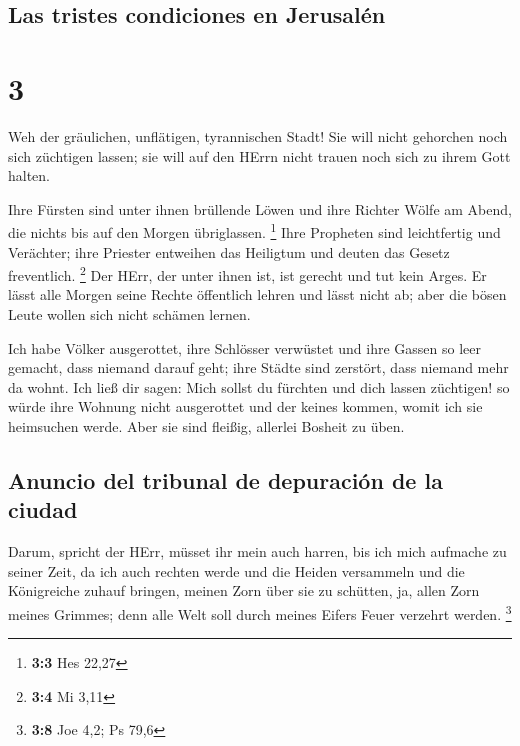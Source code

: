 \hypertarget{las-tristes-condiciones-en-jerusaluxe9n}{%
\subsection{Las tristes condiciones en
Jerusalén}\label{las-tristes-condiciones-en-jerusaluxe9n}}

\hypertarget{section-2}{%
\section{3}\label{section-2}}

 Weh der gräulichen, unflätigen, tyrannischen Stadt!
 Sie will nicht gehorchen noch sich züchtigen lassen; sie
will auf den HErrn nicht trauen noch sich zu ihrem Gott halten.

 Ihre Fürsten sind unter ihnen brüllende Löwen und ihre
Richter Wölfe am Abend, die nichts bis auf den Morgen übriglassen.
\footnote{\textbf{3:3} Hes 22,27}  Ihre Propheten sind
leichtfertig und Verächter; ihre Priester entweihen das Heiligtum und
deuten das Gesetz freventlich. \footnote{\textbf{3:4} Mi 3,11}
 Der HErr, der unter ihnen ist, ist gerecht und tut kein
Arges. Er lässt alle Morgen seine Rechte öffentlich lehren und lässt
nicht ab; aber die bösen Leute wollen sich nicht schämen lernen.

 Ich habe Völker ausgerottet, ihre Schlösser verwüstet und
ihre Gassen so leer gemacht, dass niemand darauf geht; ihre Städte sind
zerstört, dass niemand mehr da wohnt.  Ich ließ dir sagen:
Mich sollst du fürchten und dich lassen züchtigen! so würde ihre Wohnung
nicht ausgerottet und der keines kommen, womit ich sie heimsuchen werde.
Aber sie sind fleißig, allerlei Bosheit zu üben.

\hypertarget{anuncio-del-tribunal-de-depuraciuxf3n-de-la-ciudad}{%
\subsection{Anuncio del tribunal de depuración de la
ciudad}\label{anuncio-del-tribunal-de-depuraciuxf3n-de-la-ciudad}}

 Darum, spricht der HErr, müsset ihr mein auch harren, bis
ich mich aufmache zu seiner Zeit, da ich auch rechten werde und die
Heiden versammeln und die Königreiche zuhauf bringen, meinen Zorn über
sie zu schütten, ja, allen Zorn meines Grimmes; denn alle Welt soll
durch meines Eifers Feuer verzehrt werden. \footnote{\textbf{3:8} Joe
  4,2; Ps 79,6}

